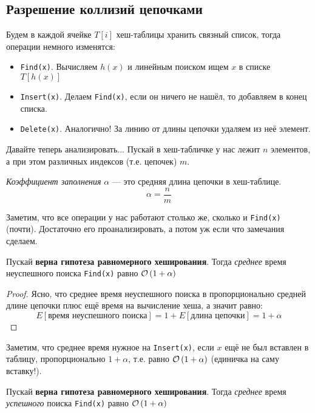 \subsection{Разрешение коллизий цепочками}
Будем в каждой ячейке $T[i]$ хеш-таблицы хранить связный список, тогда операции немного изменятся:
\begin{itemize}
    \item \texttt{Find(x)}. Вычисляем $h(x)$ и линейным поиском ищем $x$ в списке $T[h(x)]$ 
    \item \texttt{Insert(x)}. Делаем \texttt{Find(x)}, если он ничего не нашёл, то добавляем в конец списка.
    \item \texttt{Delete(x)}. Аналогично! За линию от длины цепочки удаляем из неё элемент.
\end{itemize}
Давайте теперь анализировать... Пускай в хеш-табличке у нас лежит $n$ элементов, а при этом различных индексов (т.е. цепочек) $m$.
\begin{defn}
\emph{Коэффициент заполнения} $\alpha$ --- это средняя длина цепочки в хеш-таблице.
\[
    \alpha = \frac{n}{m}
\]
\end{defn}
Заметим, что все операции у нас работают столько же, сколько и \texttt{Find(x)} (почти). Достаточно его проанализировать, а потом уж если что замечания сделаем.
\begin{thm}
Пускай \textbf{верна гипотеза равномерного хеширования}. Тогда \emph{среднее} время неуспешного поиска \texttt{Find(x)} равно $\mathcal{O}\left(1 + \alpha\right)$
\end{thm}
\begin{proof}
Ясно, что среднее время неуспешного поиска в пропорционально средней длине цепочки плюс ещё время на вычисление хеша, а значит равно:
\[
    E[\text{время неуспешного поиска}] = 1 + E[\text{длина цепочки}] = 1 + \alpha
\]
\end{proof}
\begin{note}
Заметим, что среднее время нужное на \texttt{Insert(x)}, если $x$ ещё не был вставлен в таблицу, пропорционально $1 + \alpha$, т.е. равно $\mathcal{O}\left(1 + \alpha\right)$ (единичка на саму вставку!).
\end{note}
\begin{thm}
Пускай \textbf{верна гипотеза равномерного хеширования}. Тогда \emph{среднее} время \emph{успешного} поиска \texttt{Find(x)} равно $\mathcal{O}\left(1 + \alpha\right)$
\end{thm}

